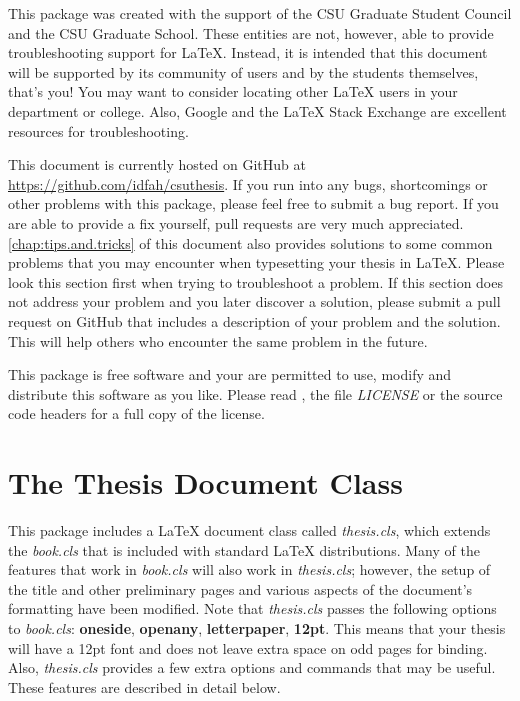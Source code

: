 \documentclass[master]{thesis}
\begin{document}
This package was created with the support of the CSU Graduate Student Council and the CSU Graduate School.  These entities are not, however, able to provide troubleshooting support for \LaTeX{}.  Instead, it is intended that this document will be supported by its community of users and by the students themselves, that's you!  You may want to consider locating other \LaTeX{} users in your department or college.  Also, Google and the \LaTeX{} Stack Exchange are excellent resources for troubleshooting.

This document is currently hosted on GitHub at \url{https://github.com/idfah/csuthesis}.  If you run into any bugs, shortcomings or other problems with this package, please feel free to submit a bug report.  If you are able to provide a fix yourself, pull requests are very much appreciated.  \cref{chap:tips.and.tricks} of this document also provides solutions to some common problems that you may encounter when typesetting your thesis in LaTeX.  Please look this section first when trying to troubleshoot a problem.  If this section does not address your problem and you later discover a solution, please submit a pull request on GitHub that includes a description of your problem and the solution.  This will help others who encounter the same problem in the future.

This package is free software and your are permitted to use, modify and distribute this software as you like.  Please read , the file \textit{LICENSE} or the source code headers for a full copy of the license.

\chapter{The Thesis Document Class}
\label{chap:thesiscls}

This package includes a \LaTeX{} document class called \textit{thesis.cls}, which extends the \textit{book.cls} that is included with standard \LaTeX{} distributions.  Many of the features that work in \textit{book.cls} will also work in \textit{thesis.cls}; however, the setup of the title and other preliminary pages and various aspects of the document's formatting have been modified.  Note that \textit{thesis.cls} passes the following options to \textit{book.cls}: \textbf{oneside}, \textbf{openany}, \textbf{letterpaper}, \textbf{12pt}.  This means that your thesis will have a 12pt font and does not leave extra space on odd pages for binding.  Also, \textit{thesis.cls} provides a few extra options and commands that may be useful.  These features are described in detail below.
\end{document}
